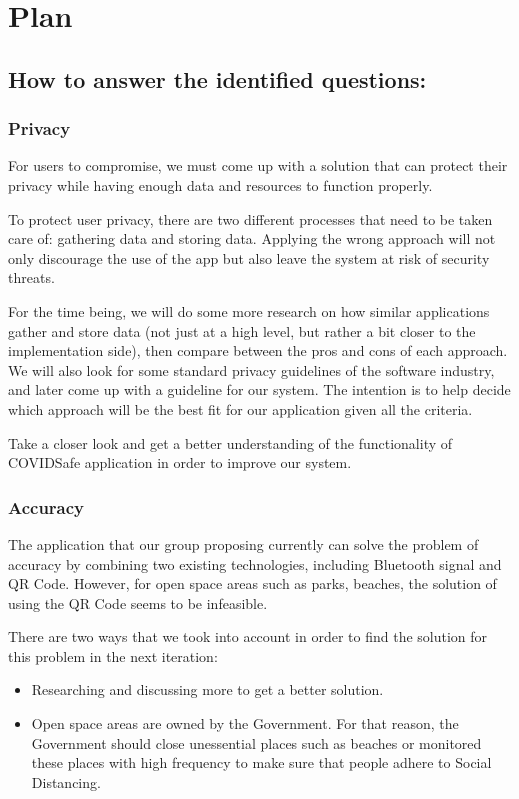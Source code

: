 \section{Plan}
  \subsection{How to answer the identified questions:}
    \subsubsection{Privacy}
      \par For users to compromise, we must come up with a solution that can protect their privacy while having enough data and resources to function properly.
      \par To protect user privacy, there are two different processes that need to be taken care of: gathering data and storing data. Applying the wrong approach will not only discourage the use of the app but also leave the system at risk of security threats.
      \par For the time being, we will do some more research on how similar applications gather and store data (not just at a high level, but rather a bit closer to the implementation side), then compare between the pros and cons of each approach. We will also look for some standard privacy guidelines of the software industry, and later come up with a guideline for our system. The intention is to help decide which approach will be the best fit for our application given all the criteria.
      \par Take a closer look and get a better understanding of the functionality of COVIDSafe application \parencite{CovidSafe} in order to improve our system.
    \subsubsection{Accuracy}
      \par The application that our group proposing currently can solve the problem of accuracy by combining two existing technologies, including Bluetooth signal and QR Code. However, for open space areas such as parks, beaches, the solution of using the QR Code seems to be infeasible.
      \par There are two ways that we took into account in order to find the solution for this problem in the next iteration:
        \begin{itemize}
          \item Researching and discussing more to get a better solution.
          \item Open space areas are owned by the Government. For that reason, the Government should close unessential places such as beaches or monitored these places with high frequency to make sure that people adhere to Social Distancing.
        \end{itemize}
